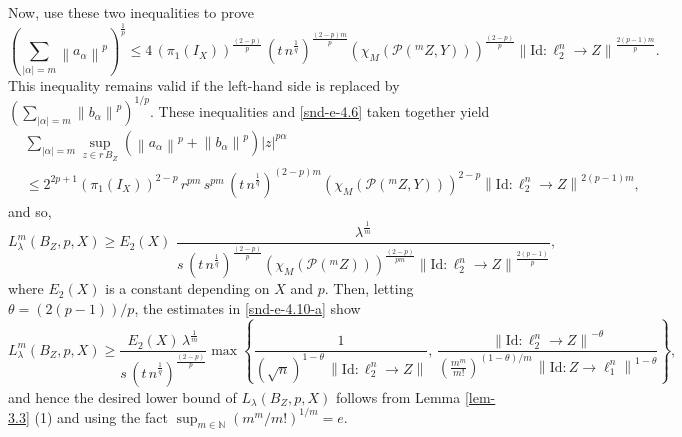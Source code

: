 \documentclass[a4paper,11pt, reqno]{amsart}
\theoremstyle{definition}
\newcommand{\real}{{\operatorname{Re}\,}}
\newcommand{\norm}[1]{\left\lVert#1\right\rVert}
\begin{document}
	Now, use these two inequalities to prove
	$$\left(\sum_{|\alpha|=m} \norm{a_{\alpha}}^p\right)^{\frac{1}{p}} \leq 
	4\,(\pi_{1}(I_{X}))^{\frac{(2-p)}{p}}\, \left(t\, n^{\frac{1}{q}}\right)^{\frac{(2-p)m}{p}} (\chi_{M}(\mathcal{P}(^mZ,Y)))^{\frac{(2-p)}{p}} \norm{\mathrm{Id}:\ell^n _2 \rightarrow Z}^{ \frac{2(p-1)m}{p}}.$$
	This inequality remains valid if the left-hand side is replaced by $\left(\sum_{|\alpha|=m} \norm{b_{\alpha}}^p\right)^{1/p}$. These inequalities and \eqref{snd-e-4.6} taken together yield 
	\begin{align*}
		&\sum_{|\alpha|=m} \sup_{z \in r \, B_{Z}} (\norm{a_{\alpha}}^p+\norm{b_{\alpha}}^p)|z|^{p\alpha}\\
		& \leq 2^{2p+1}(\pi_{1}(I_{X}))^{2-p}\,r^{pm}\, s^{pm}\, \left(t\, n^{\frac{1}{q}}\right)^{(2-p)m} (\chi_{M}(\mathcal{P}(^mZ,Y)))^{2-p} \norm{\mathrm{Id}:\ell^n _2 \rightarrow Z}^{2(p-1) m},
	\end{align*}
	and so, 
	$$L^{m}_{\lambda}(B_{Z}, p,X) \geq E_{2}(X)\,  \,
	\frac{\lambda^{\frac{1}{m}}}{s\,\left(t\, n^{\frac{1}{q}}\right)^{\frac{(2-p)}{p}}(\chi_{M}(\mathcal{P}(^mZ)))^{\frac{(2-p)}{pm}} \norm{\mathrm{Id}:\ell^n _2 \rightarrow Z}^{\frac{2(p-1)}{p}}}
	,$$ where $E_{2}(X)$ is a constant depending on $X$ and $p$. Then, letting $\theta = (2(p-1))/p$, the estimates in \eqref{snd-e-4.10-a} show
	\begin{equation*}
		L^{m}_{\lambda}(B_{Z}, p,X) \geq  \frac{E_{2}(X)\,\lambda^{\frac{1}{m}}}{s\,\left(t\, n^{\frac{1}{q}}\right)^{\frac{(2-p)}{p}}}\max \left\{\frac{1}{(\sqrt{n})^{1-\theta}\, \norm{\mathrm{Id}: \ell^n_{2} \rightarrow Z}}, \, \frac{\norm{\mathrm{Id}:\ell^n _2 \rightarrow Z}^{-\theta}}{\left(\frac{m^m}{m!}\right)^{(1-\theta)/m}\, \norm{\mathrm{Id}: Z \rightarrow \ell^n_{1}}^{1-\theta}}\right\},
	\end{equation*}
	and hence the desired lower bound of $L_{\lambda}(B_{Z}, p,X)$ follows from Lemma \ref{lem-3.3} (1) and using the fact $\sup _{m \in \mathbb{N}} (m^m/m!)^{1/m} =e$. 
\end{document}
